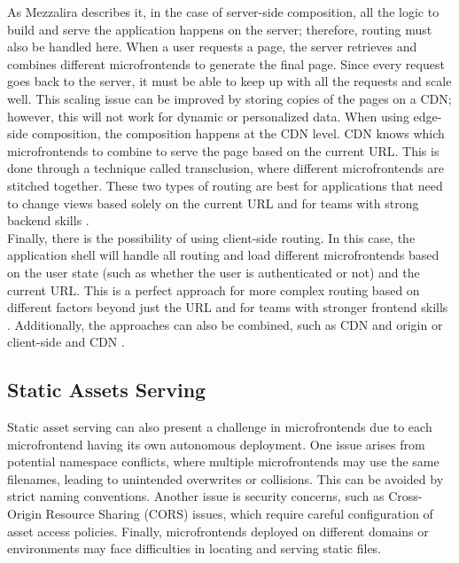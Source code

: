 \noindent
As Mezzalira \cite{MezzaliraBuildingMf} describes it, in the case of server-side composition, all the logic to build and serve the application happens on the server; therefore, routing must also be handled here. When a user requests a page, the server retrieves and combines different microfrontends to generate the final page. Since every request goes back to the server, it must be able to keep up with all the requests and scale well. This scaling issue can be improved by storing copies of the pages on a CDN; however, this will not work for dynamic or personalized data. When using edge-side composition, the composition happens at the CDN level. CDN knows which microfrontends to combine to serve the page based on the current URL. This is done through a technique called transclusion, where different microfrontends are stitched together. These two types of routing are best for applications that need to change views based solely on the current URL and for teams with strong backend skills \cite{MezzaliraBuildingMf}. \\

\noindent
Finally, there is the possibility of using client-side routing. In this case, the application shell will handle all routing and load different microfrontends based on the user state (such as whether the user is authenticated or not) and the current URL. This is a perfect approach for more complex routing based on different factors beyond just the URL and for teams with stronger frontend skills \cite{MezzaliraBuildingMf}. Additionally, the approaches can also be combined, such as CDN and origin or client-side and CDN \cite{MezzaliraBuildingMf}.

\subsection{Static Assets Serving}
Static asset serving can also present a challenge in microfrontends due to each microfrontend having its own autonomous deployment. One issue arises from potential namespace conflicts, where multiple microfrontends may use the same filenames, leading to unintended overwrites or collisions. This can be avoided by strict naming conventions. Another issue is security concerns, such as Cross-Origin Resource Sharing (CORS) issues, which require careful configuration of asset access policies. Finally, microfrontends deployed on different domains or environments may face difficulties in locating and serving static files. \\

